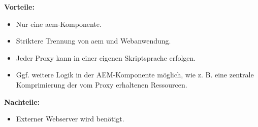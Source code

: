 \begin{minipage}[t]{0.5\textwidth}
	\textbf{Vorteile:}
	\begin{itemize}
		\item Nur eine \ac{aem}-Komponente.
		\item Striktere Trennung von \ac{aem} und Webanwendung.
		\item Jeder Proxy kann in einer eigenen Skriptsprache erfolgen.
		\item Ggf. weitere Logik in der AEM-Komponente möglich, wie z. B. eine zentrale Komprimierung der vom Proxy erhaltenen Ressourcen.
	\end{itemize}
\end{minipage}
\begin{minipage}[t]{0.5\textwidth}
	\textbf{Nachteile:}
	\begin{itemize}
		\item Externer Webserver wird benötigt.
	\end{itemize}
\end{minipage}
